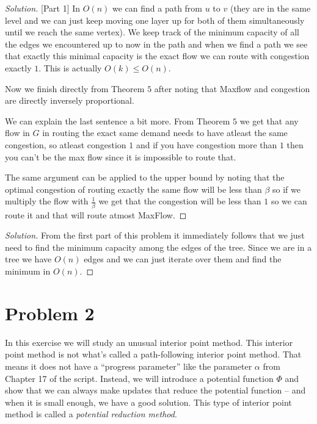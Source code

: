 \documentclass[a4paper,11pt]{article}
\newenvironment{solution}
  {\begin{proof}[Solution]}
  {\end{proof}}
\begin{document}
\begin{solution} [Part 1]
In $O(n)$ we can find a path from $u$ to $v$ (they are in the same level and we can just keep moving one layer up for both of them simultaneously until we reach the same vertex). We keep track of the minimum capacity of all the edges we encountered up to now in the path and when we find a path we see that exactly this minimal capacity is the exact flow we can route with congestion exactly $1$. This is actually $O(k)\leq O(n)$.

Now we finish directly from Theorem $5$ after noting that Maxflow and congestion are directly inversely proportional.

We can explain the last sentence a bit more. From Theorem $5$ we get that any flow in $G$ in routing the exact same demand needs to have atleast the same congestion, so atleast congestion $1$ and if you have congestion more than $1$ then you can't be the max flow since it is impossible to route that.

The same argument can be applied to the upper bound by noting that the optimal congestion of routing exactly the same flow will be less than $\beta$ so if we multiply the flow with $\frac 1 \beta $ we get that the congestion will be less than $1$ so we can route it and that will route atmost MaxFlow.
\end{solution}

\begin{solution}
From the first part of this problem it immediately follows that we just need to find the minimum capacity among the edges of the tree. Since we are in a tree we have $O(n)$ edges and we can just iterate over them and find the minimum in $O(n)$.
\end{solution}

\newpage
\section*{Problem 2}


In this exercise we will study an unusual interior point method. This interior point method is not what's called a path-following interior point method. That means it does not have a ``progress parameter'' like the parameter \(\alpha\) from Chapter 17 of the script. Instead, we will introduce a potential function \(\Phi\) and show that we can always make updates that reduce the potential function -- and when it is small enough, we have a good solution. This type of interior point method is called a \emph{potential reduction method}.
\end{document}
